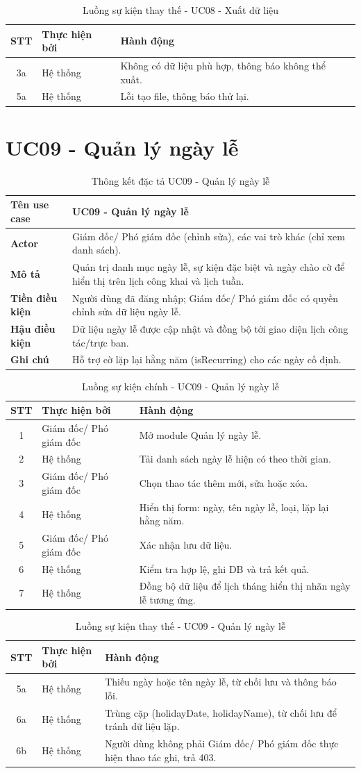 \documentclass[18pt,a4paper]{report}
\newcommand{\specinfo}[6]{
\begin{table}[H]
\centering
\caption{Thông kết đặc tả #1}
\begin{tabularx}{\textwidth}{|>{\raggedright\arraybackslash}p{3.2cm}|X|}
\hline
\textbf{Tên use case} & #1 \\ \hline
\textbf{Actor} & #2 \\ \hline
\textbf{Mô tả} & #3 \\ \hline
\textbf{Tiền điều kiện} & #4 \\ \hline
\textbf{Hậu điều kiện} & #5 \\ \hline
\textbf{Ghi chú} & #6 \\ \hline
\end{tabularx}
\end{table}
}
\newcommand{\mainflowtable}[1]{
\begin{table}[H]
\centering
\caption{Luồng sự kiện chính - #1}
\begin{tabularx}{\textwidth}{|c|>{\raggedright\arraybackslash}p{3cm}|X|}
\hline
\textbf{STT} & \textbf{Thực hiện bởi} & \textbf{Hành động} \\ \hline
}
\newcommand{\altflowtable}[1]{
\begin{table}[H]
\centering
\caption{Luồng sự kiện thay thế - #1}
\begin{tabularx}{\textwidth}{|c|>{\raggedright\arraybackslash}p{3cm}|X|}
\hline
\textbf{STT} & \textbf{Thực hiện bởi} & \textbf{Hành động} \\ \hline
}
\begin{document}
\altflowtable{UC08 - Xuất dữ liệu}
3a & Hệ thống & Không có dữ liệu phù hợp, thông báo không thể xuất. \\ \hline
5a & Hệ thống & Lỗi tạo file, thông báo thử lại. \\ \hline
\end{tabularx}
\end{table}

\section{UC09 - Quản lý ngày lễ}
\specinfo
{UC09 - Quản lý ngày lễ}
{Giám đốc/ Phó giám đốc (chỉnh sửa), các vai trò khác (chỉ xem danh sách).}
{Quản trị danh mục ngày lễ, sự kiện đặc biệt và ngày chào cờ để hiển thị trên lịch công khai và lịch tuần.}
{Người dùng đã đăng nhập; Giám đốc/ Phó giám đốc có quyền chỉnh sửa dữ liệu ngày lễ.}
{Dữ liệu ngày lễ được cập nhật và đồng bộ tới giao diện lịch công tác/trực ban.}
{Hỗ trợ cờ lặp lại hằng năm (isRecurring) cho các ngày cố định.}

\mainflowtable{UC09 - Quản lý ngày lễ}
1 & Giám đốc/ Phó giám đốc & Mở module Quản lý ngày lễ. \\ \hline
2 & Hệ thống & Tải danh sách ngày lễ hiện có theo thời gian. \\ \hline
3 & Giám đốc/ Phó giám đốc & Chọn thao tác thêm mới, sửa hoặc xóa. \\ \hline
4 & Hệ thống & Hiển thị form: ngày, tên ngày lễ, loại, lặp lại hằng năm. \\ \hline
5 & Giám đốc/ Phó giám đốc & Xác nhận lưu dữ liệu. \\ \hline
6 & Hệ thống & Kiểm tra hợp lệ, ghi DB và trả kết quả. \\ \hline
7 & Hệ thống & Đồng bộ dữ liệu để lịch tháng hiển thị nhãn ngày lễ tương ứng. \\ \hline
\end{tabularx}
\end{table}

\altflowtable{UC09 - Quản lý ngày lễ}
5a & Hệ thống & Thiếu ngày hoặc tên ngày lễ, từ chối lưu và thông báo lỗi. \\ \hline
6a & Hệ thống & Trùng cặp (holidayDate, holidayName), từ chối lưu để tránh dữ liệu lặp. \\ \hline
6b & Hệ thống & Người dùng không phải Giám đốc/ Phó giám đốc thực hiện thao tác ghi, trả 403. \\ \hline
\end{tabularx}
\end{table}
\end{document}

